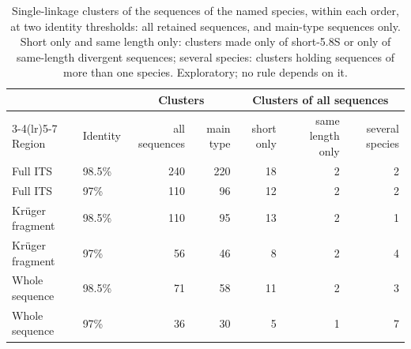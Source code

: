\begin{table}[htbp]\centering
\small\setlength{\tabcolsep}{4pt}
\caption{Single-linkage clusters of the sequences of the \NSpecies{} named species, within each order, at two identity thresholds: all retained sequences, and main-type sequences only. Short only and same length only: clusters made only of short-5.8S or only of same-length divergent sequences; several species: clusters holding sequences of more than one species. Exploratory; no rule depends on it.}\label{tab:clusters}
\begin{tabular}{llrrrrr}
\toprule
 & & \multicolumn{2}{c}{Clusters} & \multicolumn{3}{c}{Clusters of all sequences}\\
\cmidrule(lr){3-4}\cmidrule(lr){5-7}
Region & Identity & all sequences & main type & short only & same length only & several species\\
\midrule
Full ITS & 98.5\% & 240 & 220 & 18 & 2 & 2\\
Full ITS & 97\% & 110 & 96 & 12 & 2 & 2\\
Kr\"uger fragment & 98.5\% & 110 & 95 & 13 & 2 & 1\\
Kr\"uger fragment & 97\% & 56 & 46 & 8 & 2 & 4\\
Whole sequence & 98.5\% & 71 & 58 & 11 & 2 & 3\\
Whole sequence & 97\% & 36 & 30 & 5 & 1 & 7\\
\bottomrule
\end{tabular}
\end{table}
